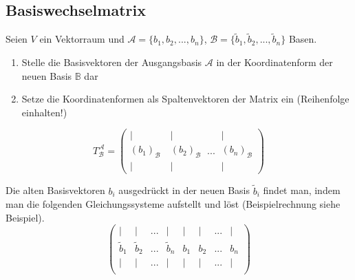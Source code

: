\documentclass{article}
\begin{document}
\subsection{Basiswechselmatrix}
Seien $V$ ein Vektorraum und $\mathcal{A} = \{b_1, b_2, ..., b_n\}$, $\mathcal{B} = \{\tilde{b}_1, \tilde{b}_2, ..., \tilde{b}_n\}$ Basen.
\begin{enumerate}
	\item Stelle die Basisvektoren der Ausgangsbasis $\mathcal{A}$ in der Koordinatenform der neuen Basis $\mathbb{B}$ dar
	\item Setze die Koordinatenformen als Spaltenvektoren der Matrix ein \textcolor{gruen}{(Reihenfolge einhalten!)}
\end{enumerate}
\begin{equation}
	T_{\mathcal{B}}^{\mathcal{A}} =
			\left(
			\begin{matrix}
				|\\
				(b_1)_{\mathcal{B}}\\
				|
			\end{matrix}\
			\begin{matrix}
				|\\
				(b_2)_{\mathcal{B}}\\
				|
			\end{matrix}\
			... \
			\begin{matrix}
				|\\
				(b_n)_{\mathcal{B}}\\
				|
			\end{matrix}
			\right)
\end{equation}

Die alten Basisvektoren $b_i$ ausgedrückt in der neuen Basis $\tilde{b}_i$ findet man, indem man die folgenden Gleichungssysteme aufstellt und löst \textcolor{gruen}{(Beispielrechnung siehe Beispiel)}.
	\begin{equation}
		\left(\begin{array}{cccc|c|c|c|c}
			| & | & ... & | & | & | & ... & | \\
			\tilde{b}_1 & \tilde{b}_2 & ... & \tilde{b}_n & b_1 & b_2 & ... & b_n\\
			| & | & ... & | & | & | & ... & | \\
		\end{array}\right)
	\end{equation}


\newpage
\end{document}
